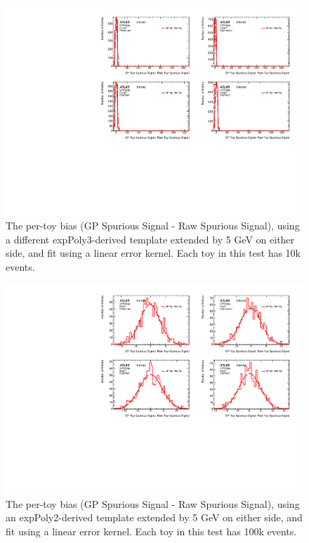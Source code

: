 \begin{figure} 
\begin{center}
  \includegraphics[width=\textwidth]{figures/background/gpr/validation/linear/ToyTest_FitSigBiases_highpT_10k_noSig}   
\caption{The per-toy bias (GP Spurious Signal - Raw Spurious Signal), using a different expPoly3-derived template extended by 5 GeV on either side, and fit using a linear error kernel. Each toy in this test has 10k events.}
\label{fig:bias_linearkernel_highpt_10k_noSig}
\end{center}
\end{figure}

\begin{figure} 
\begin{center}
  \includegraphics[width=\textwidth]{figures/background/gpr/validation/linear/ToyTest_FitSigBiases_lowpT_100k_noSig}   
\caption{The per-toy bias (GP Spurious Signal - Raw Spurious Signal), using an expPoly2-derived template extended by 5 GeV on either side, and fit using a linear error kernel. Each toy in this test has 100k events.}
\label{fig:bias_linearkernel_lowpt_100k_noSig}
\end{center}
\end{figure}


